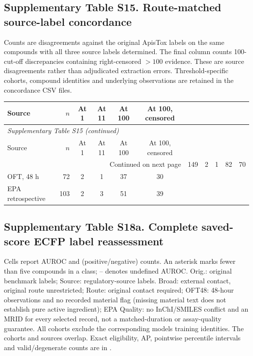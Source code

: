 \subsection*{Supplementary Table S15. Route-matched source-label concordance}

Counts are disagreements against the original ApisTox labels on the same compounds with all three source labels determined. The final column counts 100-cut-off discrepancies containing right-censored $>100$ evidence. These are source disagreements rather than adjudicated extraction errors. Threshold-specific cohorts, compound identities and underlying observations are retained in the concordance CSV files.

\begingroup\small\setlength{\tabcolsep}{4pt}

\begin{longtable}{lrcccc}

\toprule Source & $n$ & At 1 & At 11 & At 100 & At 100, censored \\ \midrule\endfirsthead

\multicolumn{6}{l}{\textit{Supplementary Table S15 (continued)}} \\

\toprule Source & $n$ & At 1 & At 11 & At 100 & At 100, censored \\ \midrule\endhead

\midrule\multicolumn{6}{r}{Continued on next page}\endfoot\bottomrule\endlastfoot

OFT & 149 & 2 & 1 & 82 & 70 \\
OFT, 48 h & 72 & 2 & 1 & 37 & 30 \\
EPA retrospective & 103 & 2 & 3 & 51 & 39 \\

\end{longtable}\endgroup

\subsection*{Supplementary Table S18a. Complete saved-score ECFP label reassessment}

Cells report AUROC and (positive/negative) counts. An asterisk marks fewer than five compounds in a class; -- denotes undefined AUROC. Orig.: original benchmark labels; Source: regulatory-source labels. Broad: external contact, original route unrestricted; Route: original contact required; OFT48: 48-hour observations and no recorded material flag (missing material text does not establish pure active ingredient); EPA Quality: no InChI/SMILES conflict and an MRID for every selected record, not a matched-duration or assay-quality guarantee. All cohorts exclude the corresponding model\textquotesingle s training identities. The cohorts and sources overlap. Exact eligibility, AP, pointwise percentile intervals and valid/degenerate counts are in .


